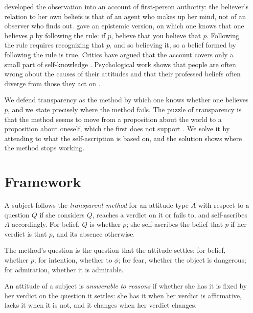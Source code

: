 \documentclass{situationist-preprint}
\begin{document}
\citet{Moran2001} developed the observation into an account of first-person authority: the believer's relation to her own beliefs is that of an agent who makes up her mind, not of an observer who finds out. \citet{Byrne2005,Byrne2018} gave an epistemic version, on which one knows that one believes $p$ by following the rule: if $p$, believe that you believe that $p$. Following the rule requires recognizing that $p$, and so believing it, so a belief formed by following the rule is true. Critics have argued that the account covers only a small part of self-knowledge \citep{Gertler2011,Cassam2014}. Psychological work shows that people are often wrong about the causes of their attitudes \citep{NisbettWilson1977} and that their professed beliefs often diverge from those they act on \citep{Schwitzgebel2010,Gendler2008}.

We defend transparency as the method by which one knows whether one believes $p$, and we state precisely where the method fails. The puzzle of transparency is that the method seems to move from a proposition about the world to a proposition about oneself, which the first does not support \citep{Byrne2005}. We solve it by attending to what the self-ascription is based on, and the solution shows where the method stops working.

\section{Framework}

\begin{definition}\label{d:method}
A subject follows the \emph{transparent method} for an attitude type $A$ with respect to a question $Q$ if she considers $Q$, reaches a verdict on it or fails to, and self-ascribes $A$ accordingly. For belief, $Q$ is whether $p$; she self-ascribes the belief that $p$ if her verdict is that $p$, and its absence otherwise.
\end{definition}

The method's question is the question that the attitude settles: for belief, whether $p$; for intention, whether to $\phi$; for fear, whether the object is dangerous; for admiration, whether it is admirable.

\begin{definition}[Answerability]\label{d:answer}
An attitude of a subject is \emph{answerable to reasons} if whether she has it is fixed by her verdict on the question it settles: she has it when her verdict is affirmative, lacks it when it is not, and it changes when her verdict changes.
\end{definition}
\end{document}
